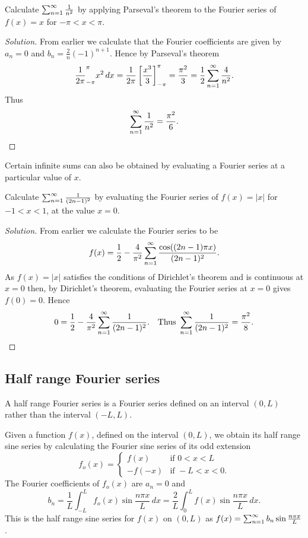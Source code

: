 \documentclass[10pt, a4paper]{article}
\begin{document}
\begin{example}
    Calculate $\infsum[n = 1]\frac{1}{n ^ 2}$ by applying Parseval's theorem to the Fourier series of $f(x) = x$ for $-\pi < x < \pi$.
    \begin{proof}[Solution]\renewcommand{\qedsymbol}{}
        From earlier we calculate that the Fourier coefficients are given by $a_n = 0$ and $b_n = \frac{2}{n}(-1) ^ {n + 1}$.
        Hence by Parseval's theorem
        \[
        \frac{1}{2\pi}_{-\pi}^{\pi}x ^ 2\,dx = \frac{1}{2\pi}\left[\frac{x ^ 3}{3}\right]_{-\pi}^{\pi} = \frac{\pi ^ 2}{3} = \frac{1}{2}\infsum[n = 1]\frac{4}{n ^ 2}.
        \]
        Thus
        \[
        \infsum[n = 1]\frac{1}{n ^ 2} = \frac{\pi ^ 2}{6}.
        \]
    \end{proof}
\end{example}
Certain infinite sums can also be obtained by evaluating a Fourier series at a particular value of $x$.
\begin{example}
    Calculate $\infsum[n = 1]\frac{1}{(2n - 1) ^ 2}$ by evaluating the Fourier series of $f(x) = |x|$ for $-1 < x < 1$,
    at the value $x = 0$.
    \begin{proof}[Solution]\renewcommand{\qedsymbol}{}
        From earlier we calculate the Fourier series to be
        \[
        f(x) = \frac{1}{2} - \frac{4}{\pi ^ 2}\infsum[n = 1]\frac{\cos((2n - 1)\pi x)}{(2n - 1) ^ 2}.
        \]
        As $f(x) = |x|$ satisfies the conditions of Dirichlet's theorem and is continuous at $x = 0$ then,
        by Dirichlet's theorem,
        evaluating the Fourier series at $x = 0$ gives $f(0) = 0$.
        Hence
        \[
        0 = \frac{1}{2} - \frac{4}{\pi ^ 2}\infsum[n = 1]\frac{1}{(2n - 1) ^ 2}.\quad\text{Thus } \infsum[n = 1]\frac{1}{(2n - 1) ^ 2} = \frac{\pi ^ 2}{8}.
        \]
    \end{proof}
\end{example}

\subsection{Half range Fourier series}
A half range Fourier series is a Fourier series defined on an interval $(0, L)$ rather than the interval $(-L, L)$.

Given a function $f(x)$,
defined on the interval $(0, L)$,
we obtain its half range sine series by calculating the Fourier sine series of its odd extension
\[
f_o(x) = \begin{cases}
    f(x) & \text{if } 0 < x < L \\
    -f(-x) & \text{if } -L < x < 0.
\end{cases}
\]
The Fourier coefficients of $f_o(x)$ are $a_n = 0$ and
\[
b_n = \frac{1}{L}\int_{-L}^{L}f_o(x)\sin{\frac{n\pi x}{L}}\,dx = \frac{2}{L}\int_{0}^{L}f(x)\sin{\frac{n\pi x}{L}}\,dx.
\]
This is the half range sine series for $f(x)$ on $(0, L)$ as $f(x) = \infsum[n = 1]b_n\sin{\frac{n\pi x}{L}}$.
\end{document}
